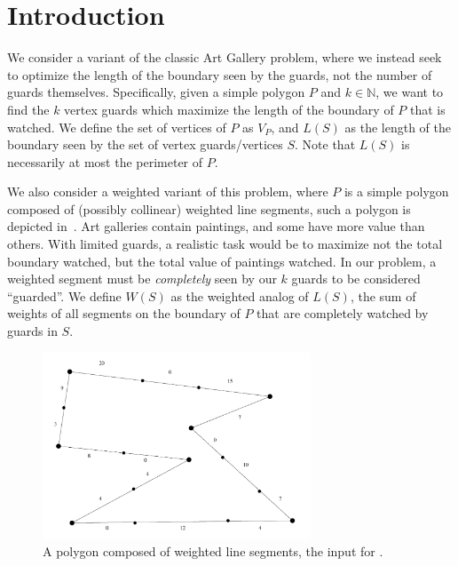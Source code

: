 \section{Introduction}
We consider a variant of the classic Art Gallery problem, where we instead seek to optimize the length of the boundary seen by the guards, not the number of guards themselves. Specifically, given a simple polygon $P$ and $k\in\mathbb{N}$, we want to find the $k$ vertex guards which maximize the length of the boundary of $P$ that is watched. We define the set of vertices of $P$ as $V_P$, and $L(S)$ as the length of the boundary seen by the set of vertex guards/vertices $S$. Note that $L(S)$ is necessarily at most the perimeter of $P$. 


We also consider a weighted variant of this problem, where $P$ is a simple polygon composed of (possibly collinear) weighted line segments, such a polygon is depicted in~. Art galleries contain paintings, and some have more value than others. With limited guards, a realistic task would be to maximize not the total boundary watched, but the total value of paintings watched. In our problem, a weighted segment must be \emph{completely} seen by our $k$ guards to be considered ``guarded''. We define $W(S)$ as the weighted analog of $L(S)$, the sum of weights of all segments on the boundary of $P$ that are completely watched by guards in $S$.

\begin{figure}
    \centering
    \includegraphics[width=8cm]{figures/weighted-polygon.png}
    \caption{A polygon composed of weighted line segments, the input for \MVVG{}.}
    \label{fig:weighted-polygon}
\end{figure}


